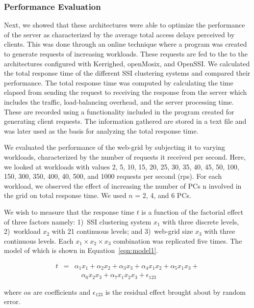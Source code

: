 \documentclass[preprint]{acm_proc_article-sp}
\begin{document}
\subsubsection{Performance Evaluation}
Next, we showed that these architectures were able to optimize the performance of the server as characterized by the average total access delays perceived by clients. This was done through an online technique where a program was created to generate requests of increasing workloads. These requests are fed to the to the architectures configured with Kerrighed, openMosix, and OpenSSI. We calculated the total response time of the different SSI clustering systems and compared their performance. The total response time was computed by calculating the time elapsed from sending the request to receiving the response from the server which includes the traffic, load-balancing overhead, and the server processing time. These are recorded using a functionality included in the program created for generating client requests. The information gathered are stored in a text file and was later used as the basis for analyzing the total response time.

We evaluated the performance of the web-grid by subjecting it to varying workloads, characterized by the number of requests it received per second. Here, we looked at workloads with values 2, 5, 10, 15, 20, 25, 30, 35, 40, 45, 50, 100, 150, 300, 350, 400, 40, 500, and 1000 requests per second (rps). For each workload, we observed the effect of increasing the number of PCs n involved in the grid on total response time. We used $n$ = 2, 4, and 6 PCs.

We wish to measure that the response time $t$ is a function of the factorial effect of three factors namely: 1)~SSI clustering system ${x_1}$ with three discrete levels, 2)~workload ${x_2}$ with 21 continuous levels; and 3)~web-grid size ${x_3}$ with three continuous levels. Each ${x_1}\times{x_2}\times{x_3}$ combination was replicated five times. The model of which is shown in Equation~\ref{eqn:model1}.

\begin{eqnarray}
	t &=& \alpha_1x_1+\alpha_2x_2+\alpha_3x_3+\alpha_4x_1x_2+\alpha_5x_1x_3+\nonumber\\
            & & \quad\alpha_6x_2x_3+\alpha_7x_1x_2x_3+\epsilon_{123} \label{eqn:model1}
\end{eqnarray}

where $\alpha$s are coefficients and $\epsilon_{123}$ is the residual effect brought about by random error.
\end{document}

